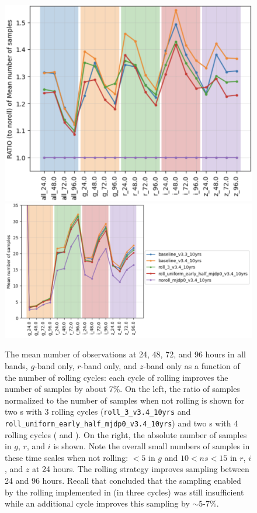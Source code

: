 \begin{figure}
    \centering

    \includegraphics[width=0.4\linewidth]{figures/rolling_sampling.png}\includegraphics[width=0.58\linewidth]{figures/rolling_nsamples.png}
    \caption{The mean number of observations at 24, 48, 72, and 96 hours in all bands, $g$-band only, $r$-band only, and $z$-band only as a function of the number of rolling cycles: each cycle of rolling improves the number of samples by about 7\%. On the left, the ratio of samples normalized to the number of samples when not rolling is shown for two \opsim s with 3 rolling cycles (\texttt{roll\_3\_v3.4\_10yrs} and \texttt{roll\_uniform\_early\_half\_mjdp0\_v3.4\_10yrs}) and two \opsim s with 4 rolling cycles ( and ). On the right, the absolute number of samples in $g$, $r$, and $i$ is shown. Note the overall small numbers of samples in these time scales when not rolling: $<5$ in $g$ and  $10<ns< 15$ in $r$, $i$, and $z$ at 24 hours. The rolling strategy improves sampling between 24 and 96 hours. Recall that  concluded that the sampling enabled by the rolling implemented in  (in three cycles) was still insufficient while an additional cycle improves this sampling by $\sim$5-7\%. %
    }
    \label{fig:rolling_sampling}
\end{figure}

